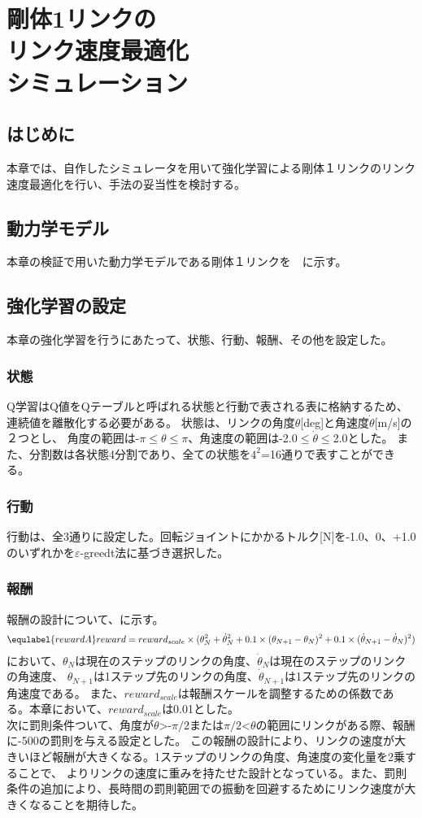 \chapter[剛体1リンクのリンク速度最適化シミュレーション]{剛体1リンクの\\リンク速度最適化\\シミュレーション}

\section{はじめに}
本章では、自作したシミュレータを用いて強化学習による剛体１リンクのリンク速度最適化を行い、手法の妥当性を検討する。
\section{動力学モデル}
本章の検証で用いた動力学モデルである剛体１リンクを　に示す。
\section{強化学習の設定}
本章の強化学習を行うにあたって、状態、行動、報酬、その他を設定した。
\subsection{状態}
Q学習はQ値をQテーブルと呼ばれる状態と行動で表される表に格納するため、連続値を離散化する必要がある。
状態は、リンクの角度$\theta$[deg]と角速度$\dot{\theta}$[m/s]の２つとし、
角度の範囲は-$\pi$$\leq$$\theta$$\leq$$\pi$、角速度の範囲は-2.0$\leq$$\dot{\theta}$$\leq$2.0とした。
また、分割数は各状態4分割であり、全ての状態を$4^{2}$=16通りで表すことができる。
\subsection{行動}
行動は、全3通りに設定した。回転ジョイントにかかるトルク[N]を-1.0、0、+1.0のいずれかを$\varepsilon$-greedt法に基づき選択した。
\subsection{報酬}
報酬の設計について、に示す。
\begin{eqnarray}
  \equlabel{rewardA}
  reward=reward_{scale}\times(\theta_N^2+\dot{\theta}_N^2
  +0.1\times(\theta_{N+1}-\theta_N)^2
  +0.1\times(\dot{\theta}_{N+1}-\dot{\theta}_N)^2)
\end{eqnarray}
において、$\theta_N$は現在のステップのリンクの角度、$\dot{\theta}_N$は現在のステップのリンクの角速度、
$\theta_{N+1}$は1ステップ先のリンクの角度、$\dot{\theta}_{N+1}$は1ステップ先のリンクの角速度である。
また、$reward_{scale}$は報酬スケールを調整するための係数である。本章において、$reward_{scale}$は0.01とした。\\
次に罰則条件ついて、角度が$\theta$>-$\pi/2$または$\pi/2$<$\theta$の範囲にリンクがある際、報酬に-500の罰則を与える設定とした。
この報酬の設計により、リンクの速度が大きいほど報酬が大きくなる。1ステップのリンクの角度、角速度の変化量を2乗することで、
よりリンクの速度に重みを持たせた設計となっている。また、罰則条件の追加により、長時間の罰則範囲での振動を回避するためにリンク速度が大きくなることを期待した。
